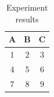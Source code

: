 \begin{table}[htbp]
\centering
\caption{Experiment results}
\label{tab:results}
\begin{tabular}{ccc}
\toprule
A & B & C \\
\midrule
1 & 2 & 3 \\
4 & 5 & 6 \\
7 & 8 & 9 \\
\bottomrule
\end{tabular}
\end{table}

